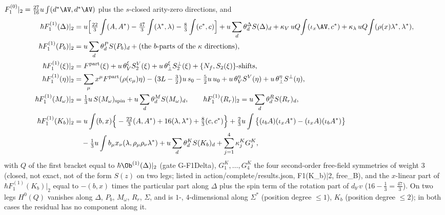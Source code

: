 \begin{proposition}
\label{prop:at-c-sol}
$F_1^{(0)}|_2=\tfrac{27}{16}u\int(d^*\AV,d^*\AV)$ plus the $s$-closed arity-zero directions, and
\[
\begin{aligned}
\hbar F_1^{(1)}(\Delta)|_2&=u\Big[\tfrac{22}3\int(A,A^*)-\tfrac{47}3\int(\lambda^*,\lambda)-\tfrac83\int(c^*,c)\Big]+u\sum_d\theta^\Delta_dS(\Delta)_d+\kappa_V\,uQ\!\int(\iota_x\AV,c^*)+\kappa_\lambda\,uQ\!\int(\rho(x)\lambda^*,\lambda^*),\\
\hbar F_1^{(1)}(P_b)|_2&=u\sum_d\theta^P_dS(P_b)_d+(\text{the }b\text{-parts of the }\kappa\text{ directions}),\\
\hbar F_1^{(1)}(\xi)|_2&=F^{\rm part}(\xi)+u\,\theta^\xi_VS^V_2(\xi)+u\,\theta^\xi_\perp S^\perp_2(\xi)+\{N_f,S_2(\xi)\}\text{-shifts},\\
\hbar F_1^{(1)}(\eta)|_2&=\sum_\mu x^\mu F^{\rm part}(\rho(e_\mu)\eta)-\big(3L-\tfrac32\big)u\,s_0-\tfrac52u\,u_0+u\,\theta^{\eta}_VS^V(\eta)+u\,\theta^{\eta}_\perp S^\perp(\eta),\\
\hbar F_1^{(1)}(M_\omega)|_2&=\tfrac13u\,S(M_\omega)_{\rm spin}+u\sum_d\theta^M_dS(M_\omega)_d,\qquad \hbar F_1^{(1)}(R_r)|_2=u\sum_d\theta^R_dS(R_r)_d,\\
\hbar F_1^{(1)}(K_b)|_2&=u\int(b,x)\Big\{-\tfrac{22}3(A,A^*)+16(\lambda,\lambda^*)+\tfrac83(c,c^*)\Big\}+\tfrac23u\int\big\{(\iota_bA)(\iota_xA^*)-(\iota_xA)(\iota_bA^*)\big\}\\
&\quad-\tfrac13u\int b_\mu x_\nu(\lambda,\rho_\mu\rho_\nu\lambda^*)+u\sum_d\theta^K_dS(K_b)_d+\sum_{j=1}^4\kappa^K_jG^K_j,
\end{aligned}
\]
with $Q$ of the first bracket equal to $\hbar\Ob^{(1)}(\Delta)|_2$ (gate G-F1Delta), $G^K_1,\dots,G^K_4$ the four second-order free-field symmetries of weight $3$ (closed, not exact, not of the form $S(z)$ on two legs; listed in action/complete/results.json, F1(K\_b)|2, free\_B), and the $x$-linear part of $\hbar F_1^{(1)}(K_b)|_2$ equal to $-(b,x)$ times the particular part along $\Delta$ plus the spin term of the rotation part of $d_{b'}v$ ($16-\tfrac13=\tfrac{47}3$). On two legs $H^0(Q)$ vanishes along $\Delta$, $P_b$, $M_\omega$, $R_r$, $\Sigma$, and is $1$-, $4$-dimensional along $\Sigma^*$ (position degree $\le1$), $K_b$ (position degree $\le2$); in both cases the residual has no component along it.
\end{proposition}

